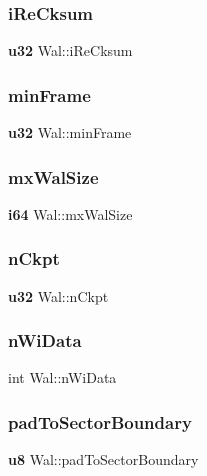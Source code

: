 \mbox{\label{struct_wal_a409c7d261a92893913e2e631974bf1aa}} 
\subsubsection{iReCksum}
{\footnotesize\ttfamily \textbf{ u32} Wal\+::i\+Re\+Cksum}

\mbox{\label{struct_wal_a8062e125a5a4393c34cd1d9758a82e74}} 
\subsubsection{minFrame}
{\footnotesize\ttfamily \textbf{ u32} Wal\+::min\+Frame}

\mbox{\label{struct_wal_a413f9f82c15d31627a2ed6eac9b6cc27}} 
\subsubsection{mxWalSize}
{\footnotesize\ttfamily \textbf{ i64} Wal\+::mx\+Wal\+Size}

\mbox{\label{struct_wal_a8fbe9b014342db76d8167b518b70acad}} 
\subsubsection{nCkpt}
{\footnotesize\ttfamily \textbf{ u32} Wal\+::n\+Ckpt}

\mbox{\label{struct_wal_ae3e69420adab92acd90dd7c03d37815f}} 
\subsubsection{nWiData}
{\footnotesize\ttfamily int Wal\+::n\+Wi\+Data}

\mbox{\label{struct_wal_af10e79ca8fe617d7df706182ebdf7039}} 
\subsubsection{padToSectorBoundary}
{\footnotesize\ttfamily \textbf{ u8} Wal\+::pad\+To\+Sector\+Boundary}

\mbox{\label{struct_wal_a3a4d051c55228e554b36691c5095ed14}} 

